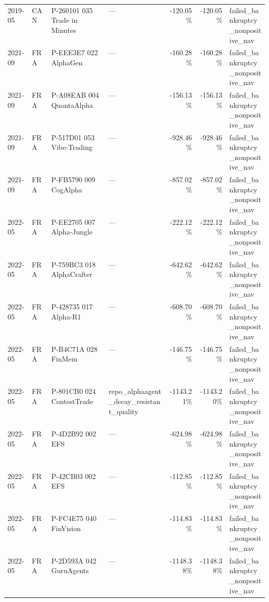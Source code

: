 \begin{longtable}{@{}llL{0.22\linewidth}L{0.23\linewidth}rrL{0.15\linewidth}@{}}
2019-05 & CAN & P-260101 035 Trade in Minutes & --- & -120.05\% & -120.05\% & failed\_\allowbreak{}bankruptcy\_\allowbreak{}nonpositive\_\allowbreak{}nav \\
2021-09 & FRA & P-EEE3E7 022 AlphaGen & --- & -160.28\% & -160.28\% & failed\_\allowbreak{}bankruptcy\_\allowbreak{}nonpositive\_\allowbreak{}nav \\
2021-09 & FRA & P-A08EAB 004 QuantaAlpha & --- & -156.13\% & -156.13\% & failed\_\allowbreak{}bankruptcy\_\allowbreak{}nonpositive\_\allowbreak{}nav \\
2021-09 & FRA & P-517D01 053 Vibe-Trading & --- & -928.46\% & -928.46\% & failed\_\allowbreak{}bankruptcy\_\allowbreak{}nonpositive\_\allowbreak{}nav \\
2021-09 & FRA & P-FB5790 009 CogAlpha & --- & -857.02\% & -857.02\% & failed\_\allowbreak{}bankruptcy\_\allowbreak{}nonpositive\_\allowbreak{}nav \\
2022-05 & FRA & P-EE2705 007 Alpha-Jungle & --- & -222.12\% & -222.12\% & failed\_\allowbreak{}bankruptcy\_\allowbreak{}nonpositive\_\allowbreak{}nav \\
2022-05 & FRA & P-759BC3 018 AlphaCrafter & --- & -642.62\% & -642.62\% & failed\_\allowbreak{}bankruptcy\_\allowbreak{}nonpositive\_\allowbreak{}nav \\
2022-05 & FRA & P-428735 017 Alpha-R1 & --- & -608.70\% & -608.70\% & failed\_\allowbreak{}bankruptcy\_\allowbreak{}nonpositive\_\allowbreak{}nav \\
2022-05 & FRA & P-B4C71A 028 FinMem & --- & -146.75\% & -146.75\% & failed\_\allowbreak{}bankruptcy\_\allowbreak{}nonpositive\_\allowbreak{}nav \\
2022-05 & FRA & P-801CB0 024 ContestTrade & repo\_\allowbreak{}alphaagent\_\allowbreak{}decay\_\allowbreak{}resistant\_\allowbreak{}quality & -1143.21\% & -1143.20\% & failed\_\allowbreak{}bankruptcy\_\allowbreak{}nonpositive\_\allowbreak{}nav \\
2022-05 & FRA & P-4D2B92 002 EFS & --- & -624.98\% & -624.98\% & failed\_\allowbreak{}bankruptcy\_\allowbreak{}nonpositive\_\allowbreak{}nav \\
2022-05 & FRA & P-42CB03 002 EFS & --- & -112.85\% & -112.85\% & failed\_\allowbreak{}bankruptcy\_\allowbreak{}nonpositive\_\allowbreak{}nav \\
2022-05 & FRA & P-FC4E75 040 FinVision & --- & -114.83\% & -114.83\% & failed\_\allowbreak{}bankruptcy\_\allowbreak{}nonpositive\_\allowbreak{}nav \\
2022-05 & FRA & P-2D593A 042 GuruAgents & --- & -1148.38\% & -1148.38\% & failed\_\allowbreak{}bankruptcy\_\allowbreak{}nonpositive\_\allowbreak{}nav \\

\end{longtable}
